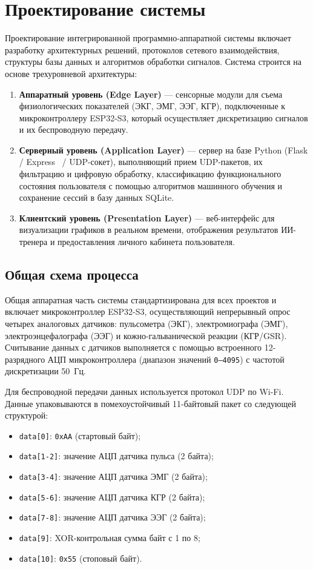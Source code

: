 \documentclass[utf8, russian]{eskdtext}
\begin{document}
\section{Проектирование системы}
Проектирование интегрированной программно-аппаратной системы включает разработку архитектурных решений, протоколов сетевого взаимодействия, структуры базы данных и алгоритмов обработки сигналов. Система строится на основе трехуровневой архитектуры:
\begin{enumerate}
    \item \textbf{Аппаратный уровень (Edge Layer)} --- сенсорные модули для съема физиологических показателей (ЭКГ, ЭМГ, ЭЭГ, КГР), подключенные к микроконтроллеру ESP32-S3, который осуществляет дискретизацию сигналов и их беспроводную передачу.
    \item \textbf{Серверный уровень (Application Layer)} --- сервер на базе Python (Flask / Express~\cite{express_docs} / UDP-сокет), выполняющий прием UDP-пакетов, их фильтрацию и цифровую обработку, классификацию функционального состояния пользователя с помощью алгоритмов машинного обучения и сохранение сессий в базу данных SQLite.
    \item \textbf{Клиентский уровень (Presentation Layer)} --- веб-интерфейс для визуализации графиков в реальном времени, отображения результатов ИИ-тренера и предоставления личного кабинета пользователя.
\end{enumerate}

\subsection{Общая схема процесса}\label{subsec:common_process}
Общая аппаратная часть системы стандартизирована для всех проектов и включает микроконтроллер ESP32-S3, осуществляющий непрерывный опрос четырех аналоговых датчиков: пульсометра (ЭКГ), электромиографа (ЭМГ), электроэнцефалографа (ЭЭГ) и кожно-гальванической реакции (КГР/GSR). Считывание данных с датчиков выполняется с помощью встроенного 12-разрядного АЦП микроконтроллера (диапазон значений \texttt{0--4095}) с частотой дискретизации 50~Гц.

Для беспроводной передачи данных используется протокол UDP по Wi-Fi. Данные упаковываются в помехоустойчивый 11-байтовый пакет со следующей структурой:
\begin{itemize}
    \item \texttt{data[0]}: \texttt{0xAA} (стартовый байт);
    \item \texttt{data[1-2]}: значение АЦП датчика пульса (2 байта);
    \item \texttt{data[3-4]}: значение АЦП датчика ЭМГ (2 байта);
    \item \texttt{data[5-6]}: значение АЦП датчика КГР (2 байта);
    \item \texttt{data[7-8]}: значение АЦП датчика ЭЭГ (2 байта);
    \item \texttt{data[9]}: XOR-контрольная сумма байт с 1 по 8;
    \item \texttt{data[10]}: \texttt{0x55} (стоповый байт).
\end{itemize}
\end{document}
